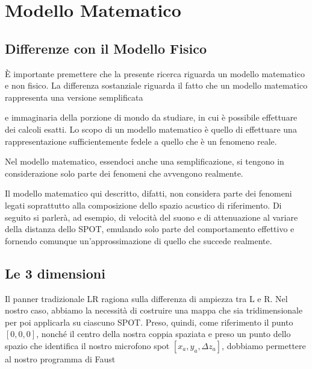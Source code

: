 \documentclass{article}
\begin{document}
\section{Modello Matematico}

    \subsection{Differenze con il Modello Fisico}
    È importante premettere che la presente ricerca riguarda un modello matematico e non fisico. La differenza sostanziale riguarda il fatto che un modello matematico rappresenta una versione semplificata
    
    
     e immaginaria della porzione di mondo da studiare, in cui è possibile effettuare dei calcoli esatti. Lo scopo di un modello matematico è quello di effettuare una rappresentazione sufficientemente fedele a quello che è un fenomeno reale.
     
     
     Nel modello matematico, essendoci anche una semplificazione, si tengono in considerazione solo parte dei fenomeni che avvengono realmente. %
     
     Il modello matematico qui descritto, difatti, non considera parte dei fenomeni legati soprattutto alla composizione dello spazio acustico di riferimento. Di seguito si parlerà, ad esempio, di velocità del suono e di attenuazione al variare della distanza dello SPOT, emulando solo parte del comportamento effettivo e fornendo comunque un'approssimazione di quello che succede realmente.
    \subsection{Le 3 dimensioni}
    Il panner tradizionale LR ragiona sulla differenza di ampiezza tra L e R. Nel nostro caso, abbiamo la necessità di costruire una mappa che sia tridimensionale per poi applicarla su ciascuno SPOT. Preso, quindi, come riferimento il punto $\left[0,0,0\right]$, nonché il centro della nostra coppia spaziata e preso un punto dello spazio che identifica il nostro microfono spot $\left[x_a,y_a,\Delta z_a\right]$, dobbiamo permettere al nostro programma di Faust 
    
\end{document}
